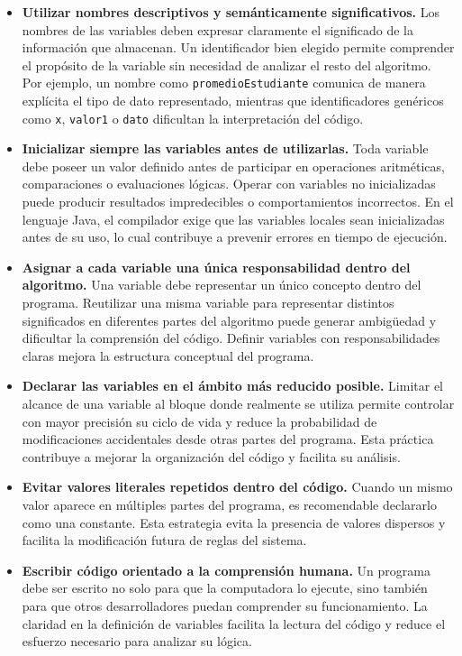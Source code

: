 \documentclass[12pt,twoside]{book}
\begin{document}
						\begin{itemize}
							
							\item \textbf{Utilizar nombres descriptivos y semánticamente significativos.}  
							Los nombres de las variables deben expresar claramente el significado de la información que almacenan. Un identificador bien elegido permite comprender el propósito de la variable sin necesidad de analizar el resto del algoritmo. Por ejemplo, un nombre como \texttt{promedioEstudiante} comunica de manera explícita el tipo de dato representado, mientras que identificadores genéricos como \texttt{x}, \texttt{valor1} o \texttt{dato} dificultan la interpretación del código.
							
							\item \textbf{Inicializar siempre las variables antes de utilizarlas.}  
							Toda variable debe poseer un valor definido antes de participar en operaciones aritméticas, comparaciones o evaluaciones lógicas. Operar con variables no inicializadas puede producir resultados impredecibles o comportamientos incorrectos. En el lenguaje Java, el compilador exige que las variables locales sean inicializadas antes de su uso, lo cual contribuye a prevenir errores en tiempo de ejecución.
							
							\item \textbf{Asignar a cada variable una única responsabilidad dentro del algoritmo.}  
							Una variable debe representar un único concepto dentro del programa. Reutilizar una misma variable para representar distintos significados en diferentes partes del algoritmo puede generar ambigüedad y dificultar la comprensión del código. Definir variables con responsabilidades claras mejora la estructura conceptual del programa.
							
							\item \textbf{Declarar las variables en el ámbito más reducido posible.}  
							Limitar el alcance de una variable al bloque donde realmente se utiliza permite controlar con mayor precisión su ciclo de vida y reduce la probabilidad de modificaciones accidentales desde otras partes del programa. Esta práctica contribuye a mejorar la organización del código y facilita su análisis.
							
							\item \textbf{Evitar valores literales repetidos dentro del código.}  
							Cuando un mismo valor aparece en múltiples partes del programa, es recomendable declararlo como una constante. Esta estrategia evita la presencia de valores dispersos y facilita la modificación futura de reglas del sistema.
							
							\item \textbf{Escribir código orientado a la comprensión humana.}  
							Un programa debe ser escrito no solo para que la computadora lo ejecute, sino también para que otros desarrolladores puedan comprender su funcionamiento. La claridad en la definición de variables facilita la lectura del código y reduce el esfuerzo necesario para analizar su lógica.
							
						\end{itemize}
						
\end{document}
